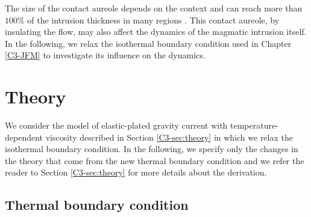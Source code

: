 The size of  the contact aureole depends on the  context and can reach
more  than  $100\%$  of  the   intrusion  thickness  in  many  regions
\citep{Galushkin:1997dy}.   This contact  aureole,  by insulating  the
flow, may also  affect the dynamics of the  magmatic intrusion itself.
In the following,  we relax the isothermal boundary  condition used in
Chapter \ref{C3-JFM} to investigate its influence on the dynamics.

\section{Theory}
\label{C4-sec:theory-1}

We  consider   the  model  of  elastic-plated   gravity  current  with
temperature-dependent      viscosity     described      in     Section
\ref{C3-sec:theory}  in   which  we  relax  the   isothermal  boundary
condition. In the following, we specify only the changes in the theory
that come  from the new  thermal boundary  condition and we  refer the
reader  to  Section \ref{C3-sec:theory}  for  more  details about  the
derivation.

\subsection{Thermal boundary condition}
\label{C4-sec:formulation-1}

